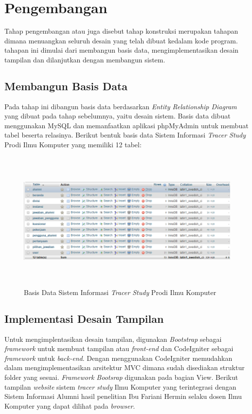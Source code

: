 \section{Pengembangan}
Tahap pengembangan atau juga disebut tahap konstruksi merupakan tahapan dimana menuangkan seluruh desain yang telah dibuat kedalam kode program. tahapan ini dimulai dari membangun basis data, mengimplementasikan desain tampilan dan dilanjutkan dengan membangun sistem.  

\subsection{Membangun Basis Data}
Pada tahap ini dibangun basis data berdasarkan \textit{Entity Relationship Diagram} yang dibuat pada tahap sebelumnya, yaitu desain sistem. Basis data dibuat menggunakan MySQL dan memanfaatkan aplikasi phpMyAdmin untuk membuat tabel beserta relasinya. Berikut bentuk basis data Sistem Informasi \textit{Tracer Study} Prodi Ilmu Komputer yang memiliki 12 tabel:

\begin{figure}[H]
	\centering
	\includegraphics[width=13cm,height=7cm]{gambar/database}
	\caption{Basis Data  Sistem Informasi \textit{Tracer Study} Prodi Ilmu Komputer }
	\label{database}
\end{figure}

\subsection{Implementasi Desain Tampilan}
Untuk mengimplentasikan desain tampilan, digunakan \textit{Bootstrap} sebagai \textit{framework} untuk membuat tampilan atau \textit{front-end} dan CodeIgniter sebagai \textit{framework} untuk \textit{back-end}. Dengan menggunakan CodeIgniter memudahkan dalam mengimplementasikan arsitektur MVC dimana sudah disediakan struktur folder yang sesuai. \textit{Framework Bootsrap} digunakan pada bagian View. Berikut tampilan \textit{website} sistem \textit{tracer study} Ilmu Komputer yang terintegrasi dengan Sistem Informasi Alumni hasil penelitian Ibu Fariani Hermin selaku dosen Ilmu Komputer yang dapat dilihat pada \textit{browser}.

